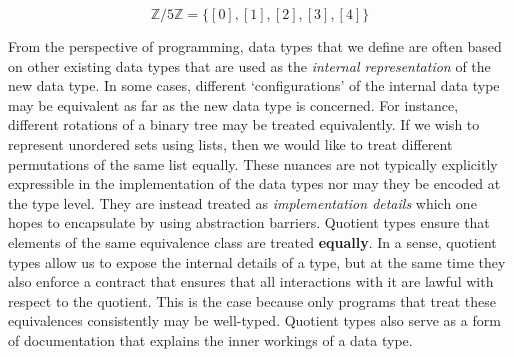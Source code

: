 \documentclass[12pt,twoside,maitrise]{dms}
\theoremstyle{definition}
\numberwithin{equation}{section}
\numberwithin{table}{chapter}
\numberwithin{figure}{chapter}
\begin{document}
\begin{equation}
\mathbb{Z} / 5\mathbb{Z} = \{ [0], [1], [2], [3], [4] \}
\end{equation}




From the perspective of programming, data types that we define are often based
on other existing data types that are used as the \emph{internal representation}
of the new data type. In some cases, different `configurations' of the internal
data type may be equivalent as far as the new data type is concerned. For
instance, different rotations of a binary tree may be treated equivalently. If
we wish to represent unordered sets using lists, then we would like to treat
different permutations of the same list equally. These nuances are not typically
explicitly expressible in the implementation of the data types nor may they be
encoded at the type level. They are instead treated as \emph{implementation
details} which one hopes to encapsulate by using abstraction barriers. Quotient
types ensure that elements of the same equivalence class are treated
\textbf{equally}. In a sense, quotient types allow us to expose the internal
details of a type, but at the same time they also enforce a contract that
ensures that all interactions with it are lawful with respect to the quotient.
This is the case because only programs that treat these equivalences
consistently may be well-typed. Quotient types also serve as a form of
documentation that explains the inner workings of a data type.
\end{document}
